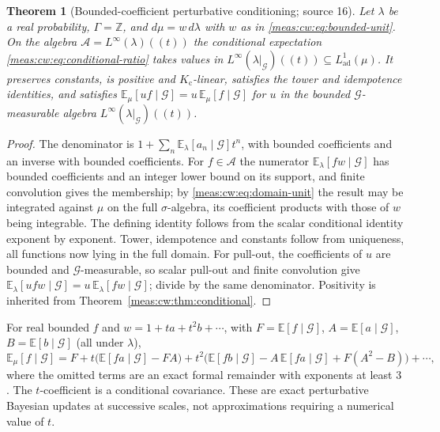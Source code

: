 \documentclass[11pt]{article}
\numberwithin{equation}{section}
\newtheorem{theorem}{Theorem}[section]
\theoremstyle{definition}
\theoremstyle{remark}
\newcommand{\Z}{\mathbb Z}
\newcommand{\E}{\mathbb E}
\newcommand{\Kc}{K_{\mathrm c}}
\newcommand{\Lad}{L^1_{\mathrm{ad}}}
\begin{document}
\begin{theorem}[Bounded-coefficient perturbative conditioning; source 16]
\label{meas:cw:thm:unit-conditional}
Let $\lambda$ be a real probability, $\Gamma=\Z$, and $d\mu=w\,d\lambda$ with $w$ as in
\eqref{meas:cw:eq:bounded-unit}. On the algebra
$\mathscr A=L^\infty(\lambda)((t))$ the conditional expectation
\eqref{meas:cw:eq:conditional-ratio} takes values in
$L^\infty(\lambda|_{\mathcal G})((t))\subseteq\Lad(\mu)$. It preserves constants, is
positive and $\Kc$-linear, satisfies the tower and idempotence identities, and
satisfies $\E_\mu[uf\mid\mathcal G]=u\,\E_\mu[f\mid\mathcal G]$ for $u$ in the bounded
$\mathcal G$-measurable algebra $L^\infty(\lambda|_{\mathcal G})((t))$.
\end{theorem}
\begin{proof}
The denominator is $1+\sum_n\E_\lambda[a_n\mid\mathcal G]t^n$, with bounded
coefficients and an inverse with bounded coefficients. For $f\in\mathscr A$ the
numerator $\E_\lambda[fw\mid\mathcal G]$ has bounded coefficients and an integer lower
bound on its support, and finite convolution gives the membership; by
\eqref{meas:cw:eq:domain-unit} the result may be integrated against $\mu$ on the full
$\sigma$-algebra, its coefficient products with those of $w$ being integrable. The
defining identity follows from the scalar conditional identity exponent by
exponent. Tower, idempotence and constants follow from uniqueness, all functions
now lying in the full domain. For pull-out, the coefficients of $u$ are bounded and
$\mathcal G$-measurable, so scalar pull-out and finite convolution give
$\E_\lambda[ufw\mid\mathcal G]=u\,\E_\lambda[fw\mid\mathcal G]$; divide by the same
denominator. Positivity is inherited from
Theorem~\ref{meas:cw:thm:conditional}.
\end{proof}

For real bounded $f$ and $w=1+ta+t^2b+\cdots$, with $F=\E[f\mid\mathcal G]$,
$A=\E[a\mid\mathcal G]$, $B=\E[b\mid\mathcal G]$ (all under $\lambda$),
\begin{equation}\label{meas:cw:eq:covariance}
 \E_\mu[f\mid\mathcal G]=F+t\bigl(\E[fa\mid\mathcal G]-FA\bigr)
 +t^2\bigl(\E[fb\mid\mathcal G]-A\,\E[fa\mid\mathcal G]+F(A^2-B)\bigr)+\cdots,
\end{equation}
where the omitted terms are an exact formal remainder with exponents at least
$3$. The $t$-coefficient is a conditional covariance. These are exact
perturbative Bayesian updates at successive scales, not approximations requiring
a numerical value of $t$.
\end{document}
